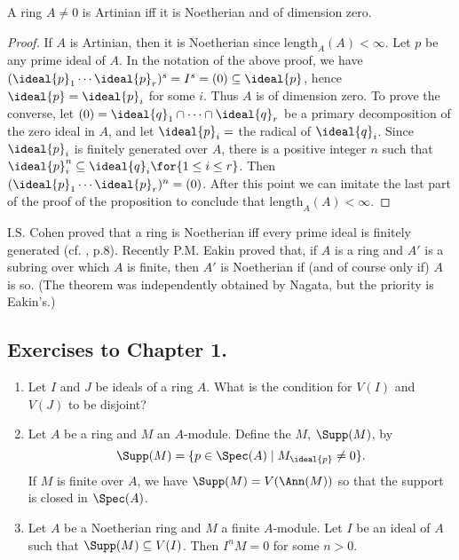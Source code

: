 \documentclass[../main]{subfiles}
\begin{document}
\begin{corollary*}
A ring $A\neq 0$ is Artinian iff it is Noetherian and of dimension zero.
\end{corollary*}
\begin{proof}
If $A$ is Artinian, then it is Noetherian since $\mathrm{length}_A(A)<\infty$. 
Let $p$ be any prime ideal of $A$. In the notation of the above proof, we have $(\ideal{p}_1\cdots\ideal{p}_r)^s=I^s=(0)\subseteq\ideal{p}$, hence $\ideal{p}=\ideal{p}_i$ for some $i$. Thus $A$ is of dimension zero. 
To prove the converse, let $(0)=\ideal{q}_1\cap\cdots\cap\ideal{q}_r$ be a primary decomposition of the zero ideal in $A$, and let $\ideal{p}_i=$ the radical of $\ideal{q}_i$. Since $\ideal{p}_i$ is finitely generated over $A$, there is a positive integer $n$ such that $\ideal{p}_i^n\subseteq\ideal{q}_i\for{1\leq i\leq r}$. Then $(\ideal{p}_1\cdots\ideal{p}_r)^n=(0)$. After this point we can imitate the last part of the proof of the proposition to conclude that $\mathrm{length}_A(A)<\infty$.
\end{proof}

\newparagraph
I.S. Cohen proved that a ring is Noetherian iff every prime ideal is finitely generated (cf. \cite{nagata1975local}, p.8). Recently P.M. Eakin \cite{eakin1968the} proved that, if $A$ is a ring and $A'$ is a subring over which $A$ is finite, then $A'$ is Noetherian if (and of course only if) $A$ is so. (The theorem was independently obtained by Nagata, but the priority is Eakin's.)

\subsection*{Exercises to Chapter 1.}
\begin{enumerate}
    \item Let $I$ and $J$ be ideals of a ring $A$. What is the condition for $V(I)$ and $V(J)$ to be disjoint?
    \item Let $A$ be a ring and $M$ an $A$-module. Define the $M$, $\Supp(M)$, by \[\Supp(M)=\{p\in\Spec(A)\mid M_{\ideal{p}}\neq 0\}.\] If $M$ is finite over $A$, we have $\Supp(M)=V(\Ann(M))$ so that the support is closed in $\Spec(A)$.
    \item Let $A$ be a Noetherian ring and $M$ a finite $A$-module. Let $I$ be an ideal of $A$ such that $\Supp(M)\subseteq V(I)$. Then $I^nM=0$ for some $n>0$.
\end{enumerate}
\end{document}
